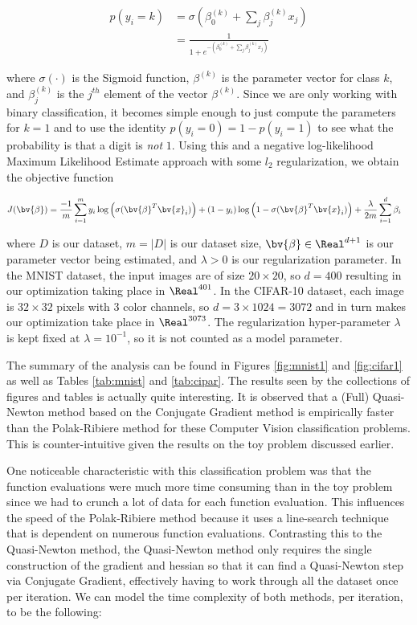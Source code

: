 \begin{align}
p(y_i = k) &= \sigma\left(\beta_{0}^{(k)} + \sum_j \beta_{j}^{(k)} x_j\right) \nonumber \\
&= \frac{1}{1+e^{-(\beta_{0}^{(k)} + \sum_j \beta_{j}^{(k)} x_j)}} \label{eq:prob}
\end{align}

where $\sigma(\cdot)$ is the Sigmoid function, $\beta^{(k)}$ is the parameter vector for class $k$, and $\beta_{j}^{(k)}$ is the $j^{th}$ element of the vector $\beta^{(k)}$. Since we are only working with binary classification, it becomes simple enough to just compute the parameters for $k = 1$ and to use the identity $p(y_i = 0) = 1 - p(y_i = 1)$ to see what the probability is that a digit is \textit{not} $1$. Using this and a negative log-likelihood Maximum Likelihood Estimate approach with some $l_2$ regularization, we obtain the objective function

\begin{align}
    J(\bv{\beta}) &= \frac{-1}{m}\sum_{i=1}^{m} y_i \log\left(\sigma(\bv{\beta}^T \bv{x}_i)\right) + (1 - y_i) \log\left(1 - \sigma(\bv{\beta}^T \bv{x}_i)\right)+ \frac{\lambda}{2 m} \sum_{i=1}^{d} \beta_{i} 
\end{align}

where $D$ is our dataset, $m = |D|$ is our dataset size, $\bv{\beta} \in \Real^{d+1}$ is our parameter vector being estimated, and $\lambda > 0$ is our regularization parameter. In the MNIST dataset, the input images are of size $20\times20$, so $d = 400$ resulting in our optimization taking place in $\Real^{401}$. In the CIFAR-10 dataset, each image is $32 \times 32$ pixels with $3$ color channels, so $d = 3 \times 1024 = 3072$ and in turn makes our optimization take place in $\Real^{3073}$. The regularization hyper-parameter $\lambda$ is kept fixed at $\lambda = 10^{-1}$, so it is not counted as a model parameter.

The summary of the analysis can be found in Figures \ref{fig:mnist1} and \ref{fig:cifar1} as well as Tables \ref{tab:mnist} and \ref{tab:cipar}. The results seen by the collections of figures and tables is actually quite interesting. It is observed that a (Full) Quasi-Newton method based on the Conjugate Gradient method is empirically faster than the Polak-Ribiere method for these Computer Vision classification problems. This is counter-intuitive given the results on the toy problem discussed earlier. 

One noticeable characteristic with this classification problem was that the function evaluations were much more time consuming than in the toy problem since we had to crunch a lot of data for each function evaluation. This influences the speed of the Polak-Ribiere method because it uses a line-search technique that is dependent on numerous function evaluations. Contrasting this to the Quasi-Newton method, the Quasi-Newton method only requires the single construction of the gradient and hessian so that it can find a Quasi-Newton step via Conjugate Gradient, effectively having to work through all the dataset once per iteration. We can model the time complexity of both methods, per iteration, to be the following: 

